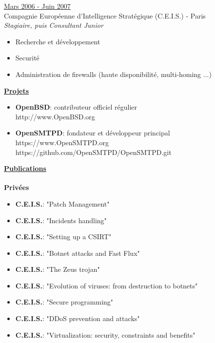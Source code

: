 \documentclass[a4paper,10pt]{letter}
\begin{document}
\begin{description}
			\item{\underline{Mars 2006 - Juin 2007}} \\
				Compagnie Europ\'eenne d'Intelligence Strat\'egique (C.E.I.S.) - Paris\\
				\textit{Stagiaire, puis Consultant Junior}
				\begin{itemize}
					\item Recherche et d\'eveloppement
					\item Securit\'e
					\item Administration de firewalls (haute disponibilit\'e, multi-homing ...)\\
				\end{itemize}
		\end{description}

\pagebreak

	\underline{\textbf{Projets}}\\
        \begin{itemize}
	\item	\textbf{OpenBSD}: contributeur officiel r\'egulier\\
          http://www.OpenBSD.org\\
	\item	\textbf{OpenSMTPD}: fondateur et d\'eveloppeur principal\\
          https://www.OpenSMTPD.org\\
          https://github.com/OpenSMTPD/OpenSMTPD.git\\
	\end{itemize}

	\underline{\textbf{Publications}}\\
		\\
		\textbf{Priv\'ees}
		\begin{itemize}
			\item	\textbf{C.E.I.S.}: "Patch Management"
			\item	\textbf{C.E.I.S.}: "Incidents handling"
			\item	\textbf{C.E.I.S.}: "Setting up a CSIRT"
			\item	\textbf{C.E.I.S.}: "Botnet attacks and Fast Flux"
			\item	\textbf{C.E.I.S.}: "The Zeus trojan"
			\item	\textbf{C.E.I.S.}: "Evolution of viruses: from destruction to botnets"
			\item	\textbf{C.E.I.S.}: "Secure programming"
			\item	\textbf{C.E.I.S.}: "DDoS prevention and attacks"
			\item	\textbf{C.E.I.S.}: "Virtualization: security, constraints and benefits"\\
		\end{itemize}
\end{document}
